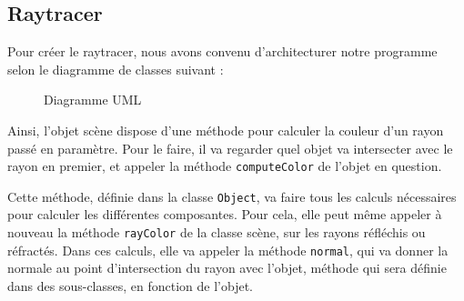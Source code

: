 \documentclass[a4paper]{article}
\begin{document}
\subsection{Raytracer}

Pour créer le raytracer, nous avons convenu d'architecturer notre programme selon le diagramme de classes suivant :

    \begin{landscape}
      \thispagestyle{empty}
      \begin{figure}[p]
        \caption{Diagramme UML\label{fig:uml}}
      \end{figure}
    \end{landscape}
    \restoregeometry

Ainsi, l'objet scène dispose d'une méthode pour calculer la couleur d'un rayon passé en paramètre.
Pour le faire, il va regarder quel objet va intersecter avec le rayon en premier, et appeler la méthode \verb+computeColor+ de l'objet en question.

Cette méthode, définie dans la classe \verb+Object+, va faire tous les calculs nécessaires pour calculer les différentes composantes. Pour cela,
elle peut même appeler à nouveau la méthode \verb+rayColor+ de la classe scène, sur les rayons réfléchis ou réfractés.
Dans ces calculs, elle va appeler la méthode \verb+normal+, qui va donner la normale au point d'intersection du rayon avec l'objet, méthode qui sera définie dans des sous-classes,
en fonction de l'objet.
\end{document}
